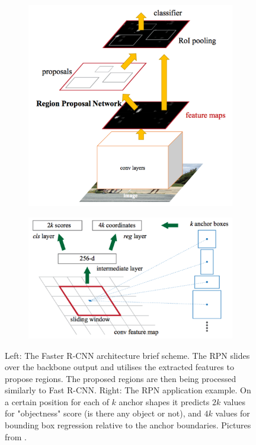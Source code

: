\documentclass[thesis=B,english]{FITthesis}[2019/12/23]
\begin{document}
\begin{figure}[h]
	\centering
	
	\begin{subfigure}[b]{.48\textwidth}
		\includegraphics[scale=0.4]{images/faster_rcnn_overall.png}
	\end{subfigure}
	\begin{subfigure}[b]{0.48\textwidth}
		\includegraphics[scale=0.5]{images/anchors.png}
	\end{subfigure}
	
	\caption{Left: The Faster R-CNN architecture brief scheme. The RPN slides over the backbone output and utilises the extracted features to propose regions. The proposed regions are then being processed similarly to Fast R-CNN. Right: The RPN application example. On a certain position for each of $k$ anchor shapes it predicts $2k$ values for "objectness" score (is there any object or not), and $4k$ values for bounding box regression relative to the anchor boundaries. Pictures from \cite{faster_rcnn}.}
\end{figure}
\end{document}
